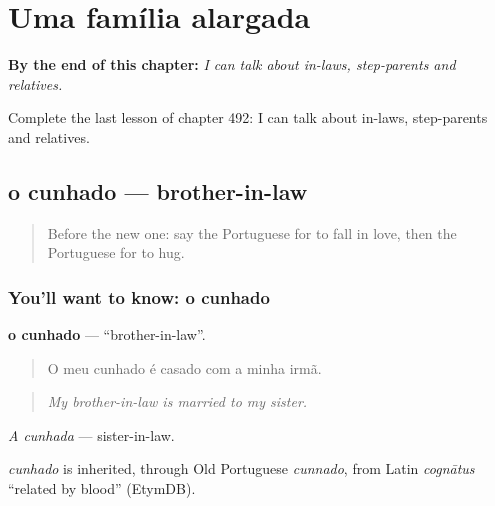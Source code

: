 
\chapter{Uma família alargada}
\label{ch:pt-uma-familia-alargada}

\begin{chapteropening}
\textbf{By the end of this chapter:} \emph{I can talk about in-laws, step-parents and relatives.}

Complete the last lesson of chapter 492: I can talk about in-laws, step-parents and relatives.
\end{chapteropening}

\section[o cunhado]{o cunhado — brother-in-law}

\label{lesson:PT-C492-cunhado}



\begin{quote}
Before the new one: say the Portuguese for to fall in love, then the Portuguese for to hug.
\end{quote}

\subsection*{You'll want to know: o cunhado}
\textbf{o cunhado} — \textquotedblleft{}brother-in-law\textquotedblright{}.

\begin{quote}
O meu cunhado é casado com a minha irmã.
\end{quote}

\begin{quote}
\emph{My brother-in-law is married to my sister.}
\end{quote}

\emph{A cunhada} — sister-in-law.

\begin{cousinweb}
\emph{cunhado} is inherited, through Old Portuguese \emph{cunnado}, from Latin \emph{cognātus} \textquotedblleft{}related by blood\textquotedblright{} (EtymDB).
\end{cousinweb}

